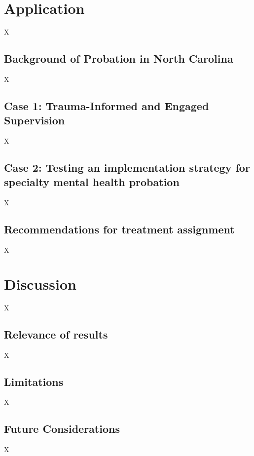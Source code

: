\documentclass{article}[11pt]
\begin{document}
\section{Application}

X

\subsection{Background of Probation in North Carolina}

X

\subsection{Case 1: Trauma-Informed and Engaged Supervision}

X

\subsection{Case 2: Testing an implementation strategy for specialty mental health probation}

X

\subsection{Recommendations for treatment assignment}

X

\section{Discussion}

X

\subsection{Relevance of results}

X

\subsection{Limitations}

X

\subsection{Future Considerations}

X
\end{document}
